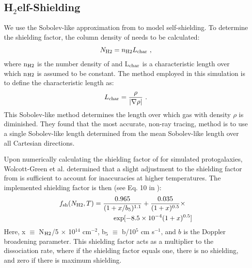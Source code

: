 \documentclass[fleqn,usenatbib]{mnras}
\begin{document}
\subsection{\texorpdfstring{H$_2$} Self-Shielding}
We use the Sobolev-like approximation from \citet{Wolcott11} to model \hh{} self-shielding. To determine the \hh{} shielding factor, the column density of \hh{} needs to be calculated:
\begin{equation} \label{Nh2}
	N_{\rm H2} = n_{\rm H2}L_{\rm char} \ ,
\end{equation}
where n$_{\rm H2}$ is the number density of \hh{} and L$_{\rm char}$ is a characteristic length over which n$_{\rm H2}$ is assumed to be constant. The method employed in this simulation is to define the characteristic length as:
\begin{equation} \label{Lchar}
	L_{\rm char} = \frac{\rho}{|\nabla \rho|} \ . 
\end{equation}
This Sobolev-like method determines the length over which gas with density $\rho$ is diminished. They found that the most accurate, non-ray tracing, method is to use a single Sobolev-like length determined from the mean Sobolev-like length over all Cartesian directions. 

Upon numerically calculating the shielding factor of \hh{} for simulated protogalaxies, Wolcott-Green et al. determined that a slight adjustment to the shielding factor from \citet{Draine96} is sufficient to account for inaccuracies at higher temperatures. The implemented shielding factor is then (see Eq. 10 in \citet{Wolcott11}):
\begin{equation} \label{shield}
	\begin{multlined}
	f_{\rm sh}(N_{\rm H2}, T) = \frac{0.965}{(1+x/b_{5})^{1.1}} + \frac{0.035}{(1+x)^{0.5}}  \times \\ \exp [-8.5 \times 10^{-4} (1+x)^{0.5}]
	\end{multlined}
\end{equation}
Here, x $\equiv$ N$_{\rm H2}$/5 $\times$ 10$^{14}$ cm$^{-2}$, b$_{5}$ $\equiv$ b/10$^{5}$ cm s$^{-1}$, and $b$ is the Doppler broadening parameter. This shielding factor acts as a multiplier to the \hh{} dissociation rate, where if the shielding factor equals one, there is no shielding, and zero if there is maximum shielding.

\end{document}
